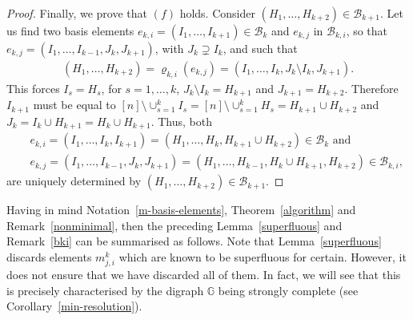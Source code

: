 \documentclass[10pt]{amsart}
\newcommand{\mbg}{\mbox{$\mathbb{G}$}}
\newcommand{\mcb}{\mbox{$\mathcal{B}$}}
\theoremstyle{definition}
\theoremstyle{remark}
\begin{document}
\begin{proof}
Finally, we prove that $(f)$ holds. Consider $(H_1,\ldots
,H_{k+2})\in\mcb_{k+1}$. Let us find two basis elements
$e_{k,i}=(I_1,\ldots ,I_{k+1})\in\mcb_k$ and $e_{k,j}$ in
$\mcb_{k,i}$, so that $e_{k,j}=(I_1,\ldots ,I_{k-1},J_k,J_{k+1})$,
with $J_k\supsetneq I_k$, and such that
\begin{eqnarray*}
(H_1,\ldots ,H_{k+2})=\varrho_{k,i}(e_{k,j})=(I_1,\ldots
  ,I_k,J_k\setminus I_k,J_{k+1}).
\end{eqnarray*}
This forces $I_{s}=H_s$, for $s=1,\ldots ,k$, $J_{k}\setminus
I_k=H_{k+1}$ and $J_{k+1}=H_{k+2}$.  Therefore $I_{k+1}$ must be equal
to $[n]\setminus \cup_{s=1}^kI_s=[n]\setminus \cup_{s=1}^kH_s=H_{k+1}\cup
H_{k+2}$ and $J_k=I_k\cup H_{k+1}=H_k\cup H_{k+1}$.  Thus, both
\begin{eqnarray*}
&& e_{k,i}=(I_1,\ldots ,I_k,I_{k+1})=(H_1,\ldots ,H_k,H_{k+1}\cup
H_{k+2})\in\mcb_k\mbox{ and }\\ && e_{k,j}=(I_1,\ldots
,I_{k-1},J_k,J_{k+1})=(H_1,\ldots ,H_{k-1},H_{k}\cup
H_{k+1},H_{k+2})\in\mcb_{k,i},
\end{eqnarray*}
are uniquely determined by $(H_1,\ldots ,H_{k+2})\in\mcb_{k+1}$.
\end{proof}

Having in mind Notation~\ref{m-basis-elements},
Theorem~\ref{algorithm} and Remark~\ref{nonminimal}, then the
preceding Lemma~\ref{superfluous} and Remark~\ref{bki} can be
summarised as follows. Note that Lemma~\ref{superfluous} discards
elements $m^k_{j,i}$ which are known to be superfluous for
certain. However, it does not ensure that we have discarded all of
them. In fact, we will see that this is precisely characterised by the
digraph $\mbg$ being strongly complete (see
Corollary~\ref{min-resolution}).
\end{document}
